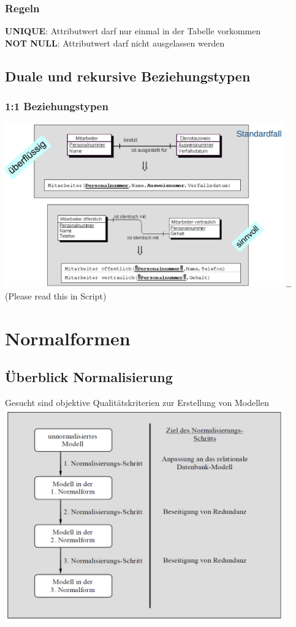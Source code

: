 \documentclass{scrreprt}
\begin{document}
\subsection{Regeln}
\textbf{UNIQUE}: Attributwert darf nur einmal in der Tabelle vorkommen
\\\textbf{NOT NULL}: Attributwert darf nicht ausgelassen werden
\section{Duale und rekursive Beziehungstypen}
\subsection{1:1 Beziehungstypen}
\includegraphics[width=0.9\textwidth]{"graphics/1zu1"}
\dots (Please read this in Script)
\chapter{Normalformen}
\section{Überblick Normalisierung}
Gesucht sind objektive Qualitätskriterien zur Erstellung von Modellen
\\\includegraphics[width=0.9\textwidth]{"graphics/Normalisierung"}
\end{document}
